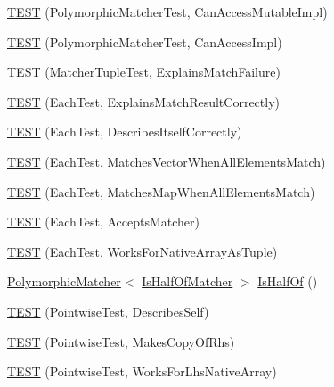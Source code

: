 \begin{DoxyCompactItemize}
\item 
\hyperlink{namespacetesting_1_1gmock__matchers__test_ae29925e94a9396fe3c7fab6efaff8d8a}{T\+E\+ST} (Polymorphic\+Matcher\+Test, Can\+Access\+Mutable\+Impl)
\item 
\hyperlink{namespacetesting_1_1gmock__matchers__test_a918a64c4594ef6b30f53d735c2e6e6ac}{T\+E\+ST} (Polymorphic\+Matcher\+Test, Can\+Access\+Impl)
\item 
\hyperlink{namespacetesting_1_1gmock__matchers__test_abc9816afa3c83fc92e2c6ecfb2dd8e63}{T\+E\+ST} (Matcher\+Tuple\+Test, Explains\+Match\+Failure)
\item 
\hyperlink{namespacetesting_1_1gmock__matchers__test_adf46df588332aa839b52af952fface1a}{T\+E\+ST} (Each\+Test, Explains\+Match\+Result\+Correctly)
\item 
\hyperlink{namespacetesting_1_1gmock__matchers__test_a183c4b7acec060c6fe3dee650bc97e6d}{T\+E\+ST} (Each\+Test, Describes\+Itself\+Correctly)
\item 
\hyperlink{namespacetesting_1_1gmock__matchers__test_a1310e7e85bf8ea8f2281850167e15465}{T\+E\+ST} (Each\+Test, Matches\+Vector\+When\+All\+Elements\+Match)
\item 
\hyperlink{namespacetesting_1_1gmock__matchers__test_a53e7c1a04b8f178af52eeaa9f190cb64}{T\+E\+ST} (Each\+Test, Matches\+Map\+When\+All\+Elements\+Match)
\item 
\hyperlink{namespacetesting_1_1gmock__matchers__test_a74f7c802ddb6879d3c76ff08d3e242b9}{T\+E\+ST} (Each\+Test, Accepts\+Matcher)
\item 
\hyperlink{namespacetesting_1_1gmock__matchers__test_aef6eeafb03f698d16206836bbb6f05b9}{T\+E\+ST} (Each\+Test, Works\+For\+Native\+Array\+As\+Tuple)
\item 
\hyperlink{classtesting_1_1PolymorphicMatcher}{Polymorphic\+Matcher}$<$ \hyperlink{classtesting_1_1gmock__matchers__test_1_1IsHalfOfMatcher}{Is\+Half\+Of\+Matcher} $>$ \hyperlink{namespacetesting_1_1gmock__matchers__test_ace0a8f64b108c7a9c32c2cac15185461}{Is\+Half\+Of} ()
\item 
\hyperlink{namespacetesting_1_1gmock__matchers__test_a2c4c39058405e13e6c6b7fcf8e6bfe43}{T\+E\+ST} (Pointwise\+Test, Describes\+Self)
\item 
\hyperlink{namespacetesting_1_1gmock__matchers__test_a9be60ebc74e280d7eb6668bfa316a765}{T\+E\+ST} (Pointwise\+Test, Makes\+Copy\+Of\+Rhs)
\item 
\hyperlink{namespacetesting_1_1gmock__matchers__test_ad0e797104a482eba2d6c137cf9b676a5}{T\+E\+ST} (Pointwise\+Test, Works\+For\+Lhs\+Native\+Array)

\end{DoxyCompactItemize}
